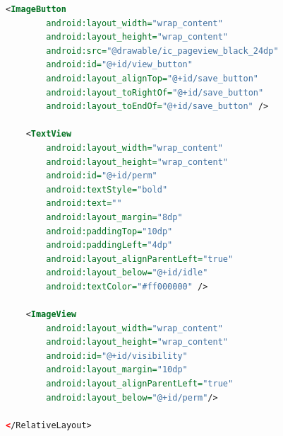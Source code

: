 \begin{lstlisting}[language=XML,caption={Vista item XML de una propiedad},label={lst:xml_item_view}]
    <ImageButton
        android:layout_width="wrap_content"
        android:layout_height="wrap_content"
        android:src="@drawable/ic_pageview_black_24dp"
        android:id="@+id/view_button"
        android:layout_alignTop="@+id/save_button"
        android:layout_toRightOf="@+id/save_button"
        android:layout_toEndOf="@+id/save_button" />

    <TextView
        android:layout_width="wrap_content"
        android:layout_height="wrap_content"
        android:id="@+id/perm"
        android:textStyle="bold"
        android:text=""
        android:layout_margin="8dp"
        android:paddingTop="10dp"
        android:paddingLeft="4dp"
        android:layout_alignParentLeft="true"
        android:layout_below="@+id/idle"
        android:textColor="#ff000000" />

    <ImageView
        android:layout_width="wrap_content"
        android:layout_height="wrap_content"
        android:id="@+id/visibility"
        android:layout_margin="10dp"
        android:layout_alignParentLeft="true"
        android:layout_below="@+id/perm"/>

</RelativeLayout>


\end{lstlisting}

